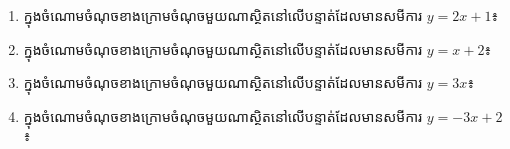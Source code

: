 \newpage
\pros
\begin{enumerate}
\item ក្នុងចំណោមចំណុចខាងក្រោមចំណុចមួយណាស្ថិតនៅលើបន្ទាត់ដែលមានសមីការ $y=2x+1$៖
\begin{enumerate}[label=\alph*.]
\end{enumerate}

\item ក្នុងចំណោមចំណុចខាងក្រោមចំណុចមួយណាស្ថិតនៅលើបន្ទាត់ដែលមានសមីការ $y=x+2$៖
\begin{enumerate}[label=\alph*.]
\end{enumerate}

\item ក្នុងចំណោមចំណុចខាងក្រោមចំណុចមួយណាស្ថិតនៅលើបន្ទាត់ដែលមានសមីការ $y=3x$៖
\begin{enumerate}[label=\alph*.]
\end{enumerate}

\item ក្នុងចំណោមចំណុចខាងក្រោមចំណុចមួយណាស្ថិតនៅលើបន្ទាត់ដែលមានសមីការ $y=-3x+2$៖
\begin{enumerate}[label=\alph*.]
\end{enumerate}


\end{enumerate}
